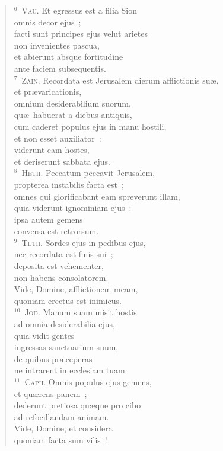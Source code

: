 \begin{flushleft}
\begin{verse}
${}^{6}$~\textsc{Vau.} Et egressus est a filia Sion\\ omnis decor ejus~;\\ facti sunt principes ejus velut arietes\\ non invenientes pascua,\\ et abierunt absque fortitudine\\ ante faciem subsequentis.\\
${}^{7}$~\textsc{Zain.} Recordata est Jerusalem dierum afflictionis su\ae ,\\ et pr\ae varicationis,\\ omnium desiderabilium suorum,\\ qu\ae\ habuerat a diebus antiquis,\\ cum caderet populus ejus in manu hostili,\\ et non esset auxiliator~:\\ viderunt eam hostes,\\ et deriserunt sabbata ejus.\\
${}^{8}$~\textsc{Heth.} Peccatum peccavit Jerusalem,\\ propterea instabilis facta est~;\\ omnes qui glorificabant eam spreverunt illam,\\ quia viderunt ignominiam ejus~:\\ ipsa autem gemens\\ conversa est retrorsum.\\
${}^{9}$~\textsc{Teth.} Sordes ejus in pedibus ejus,\\ nec recordata est finis sui~;\\ deposita est vehementer,\\ non habens consolatorem.\\ Vide, Domine, afflictionem meam,\\ quoniam erectus est inimicus.\\
${}^{10}$~\textsc{Jod.} Manum suam misit hostis\\ ad omnia desiderabilia ejus,\\ quia vidit gentes\\ ingressas sanctuarium suum,\\ de quibus pr\ae ceperas\\ ne intrarent in ecclesiam tuam.\\
${}^{11}$~\textsc{Caph.} Omnis populus ejus gemens,\\ et qu\ae rens panem~;\\ dederunt pretiosa qu\ae que pro cibo\\ ad refocillandam animam.\\ Vide, Domine, et considera\\ quoniam facta sum vilis~!\\

\end{verse}
\end{flushleft}
